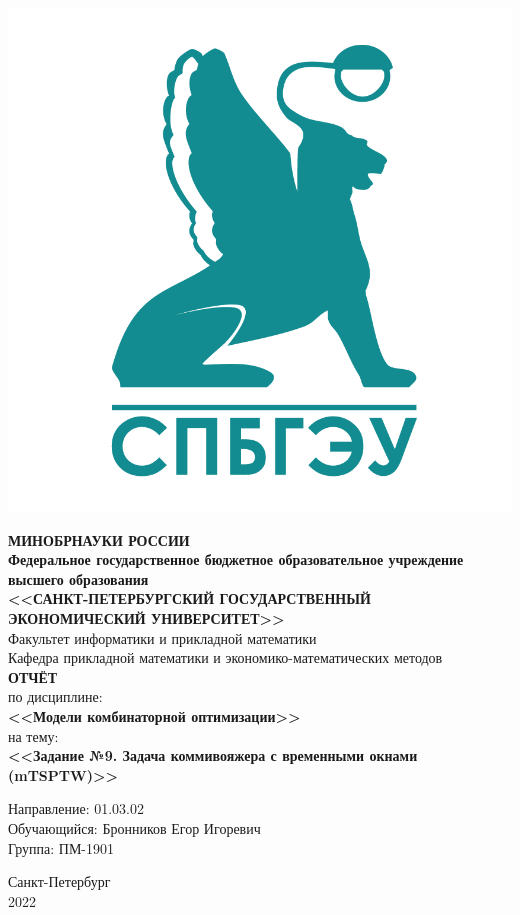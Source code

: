 \documentclass[14pt,fleqn]{extarticle}
\begin{document}
	\begin{titlepage}
		\includegraphics[scale=0.12]{logo}
		\begin{center}
			\textbf{МИНОБРНАУКИ РОССИИ}\\
			\vspace{0.2cm}
			\textbf{Федеральное государственное бюджетное образовательное учреждение высшего образования}\\
			\textbf{<<САНКТ-ПЕТЕРБУРГСКИЙ ГОСУДАРСТВЕННЫЙ ЭКОНОМИЧЕСКИЙ УНИВЕРСИТЕТ>>}\\
			\vspace{0.6cm}
			Факультет информатики и прикладной математики\\
			Кафедра прикладной математики и экономико-математических методов\\
			\vspace{1cm}
			\textbf{ОТЧЁТ}\\
			по дисциплине:\\
			\textbf{<<Модели комбинаторной оптимизации>>}\\
			на тему:\\
			\textbf{<<Задание №9. Задача коммивояжера с временными окнами (mTSPTW)>>}\\
		\end{center}
		\vspace{1cm}
		Направление: 01.03.02\\
		Обучающийся: Бронников Егор Игоревич\\
		Группа: ПМ-1901\\
		\vfill
		\begin{center}
			Санкт-Петербург\\
			2022\\
		\end{center}
	\end{titlepage}
	
\end{document}
